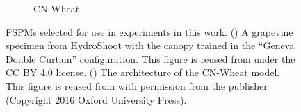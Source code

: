 \begin{figure}
\begin{subfigure}[b]{0.485\linewidth}
        \caption{CN-Wheat}
        \label{fig:cnwheat-archi}
    \end{subfigure}
    \caption[FSPMs selected for use in experiments in this work.]{
            FSPMs selected for use in experiments in this work. 
            () A grapevine specimen from HydroShoot with the canopy trained in the ``Geneva Double Curtain'' configuration.  This figure is reused from \citet{albasha_hydroshoot_2019} under the CC BY 4.0 license.
            () The architecture of the CN-Wheat model. This figure is reused from \citet{barillot_cn-wheat_2016} with permission from the publisher (Copyright 2016 Oxford University Press).
    }
    \label{fig:fading_memory_experiments}
\end{figure}

